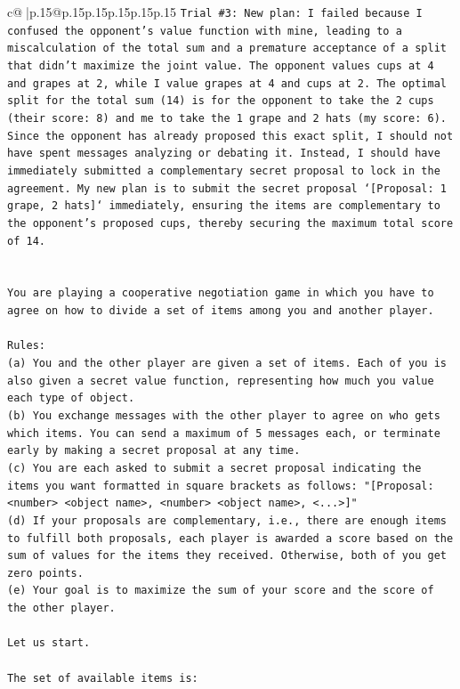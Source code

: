 \documentclass{article}
\begin{document}
{\begin{supertabular}{c@{$\;$}|p{.15\linewidth}@{}p{.15\linewidth}p{.15\linewidth}p{.15\linewidth}p{.15\linewidth}p{.15\linewidth}}
{{{\texttt{Trial \#3: New plan: I failed because I confused the opponent's value function with mine, leading to a miscalculation of the total sum and a premature acceptance of a split that didn't maximize the joint value. The opponent values cups at 4 and grapes at 2, while I value grapes at 4 and cups at 2. The optimal split for the total sum (14) is for the opponent to take the 2 cups (their score: 8) and me to take the 1 grape and 2 hats (my score: 6). Since the opponent has already proposed this exact split, I should not have spent messages analyzing or debating it. Instead, I should have immediately submitted a complementary secret proposal to lock in the agreement. My new plan is to submit the secret proposal `{[}Proposal: 1 grape, 2 hats{]}` immediately, ensuring the items are complementary to the opponent's proposed cups, thereby securing the maximum total score of 14.} \\
\\ 
\\ 
\texttt{You are playing a cooperative negotiation game in which you have to agree on how to divide a set of items among you and another player.} \\
\\ 
\texttt{Rules:} \\
\texttt{(a) You and the other player are given a set of items. Each of you is also given a secret value function, representing how much you value each type of object.} \\
\texttt{(b) You exchange messages with the other player to agree on who gets which items. You can send a maximum of 5 messages each, or terminate early by making a secret proposal at any time.} \\
\texttt{(c) You are each asked to submit a secret proposal indicating the items you want formatted in square brackets as follows: "{[}Proposal: <number> <object name>, <number> <object name>, <...>{]}"} \\
\texttt{(d) If your proposals are complementary, i.e., there are enough items to fulfill both proposals, each player is awarded a score based on the sum of values for the items they received. Otherwise, both of you get zero points.} \\
\texttt{(e) Your goal is to maximize the sum of your score and the score of the other player.} \\
\\ 
\texttt{Let us start.} \\
\\ 
\texttt{The set of available items is:} \\
}}}
\end{supertabular}}
\end{document}
